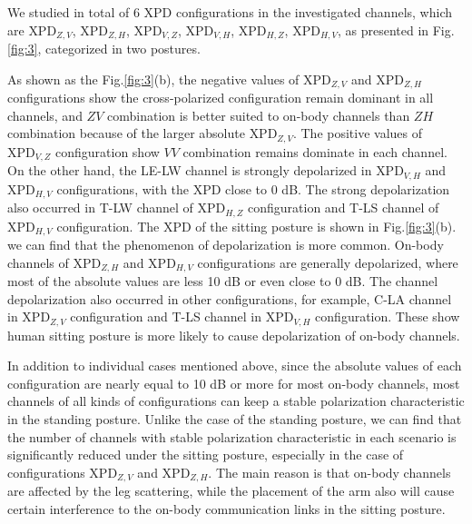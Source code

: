 \documentclass[conference]{IEEEtran}
\begin{document}

We studied in total of 6 XPD configurations in the investigated channels, which are $\text{XPD}_{Z,V}$, $\text{XPD}_{Z,H}$, $\text{XPD}_{V,Z}$, $\text{XPD}_{V,H}$, $\text{XPD}_{H,Z}$, $\text{XPD}_{H,V}$, as presented in Fig. \ref{fig:3}, categorized in two postures.


As shown as the Fig.\ref{fig:3}(b), the negative values of $\text{XPD}_{Z,V}$ and $\text{XPD}_{Z,H}$ configurations show the cross-polarized configuration remain dominant in all channels, and $ZV$ combination is better suited to on-body channels than $ZH$ combination because of the larger absolute $\text{XPD}_{Z,V}$. The positive values of $\text{XPD}_{V,Z}$ configuration show $VV$ combination remains dominate in each channel. On the other hand, the LE-LW channel is strongly depolarized in $\text{XPD}_{V,H}$ and $\text{XPD}_{H,V}$ configurations, with the XPD close to 0 dB. The strong depolarization also occurred in T-LW channel of $\text{XPD}_{H,Z}$ configuration and T-LS channel of $\text{XPD}_{H,V}$ configuration. The XPD of the sitting posture is shown in Fig.\ref{fig:3}(b). we can find that the phenomenon of depolarization is more common. On-body channels of $\text{XPD}_{Z,H}$ and $\text{XPD}_{H,V}$ configurations are generally depolarized, where most of the absolute values are less 10 dB or even close to 0 dB. The channel depolarization also occurred in other configurations, for example, C-LA channel in $\text{XPD}_{Z,V}$ configuration and T-LS channel in $\text{XPD}_{V,H}$ configuration. These show human sitting posture is more likely to cause depolarization of on-body channels.

In addition to individual cases mentioned above, since the absolute values of each configuration are nearly equal to 10 dB or more for most on-body channels, most channels of all kinds of configurations can keep a stable polarization characteristic in the standing posture. Unlike the case of  the standing posture, we can find that the number of channels with stable polarization characteristic in each scenario is significantly reduced under the sitting posture, especially in the case of configurations $\text{XPD}_{Z,V}$ and $\text{XPD}_{Z,H}$. The main reason is that on-body channels are affected by the leg scattering, while the placement of the arm also will cause certain interference to the on-body communication links in the sitting posture.
\end{document}
